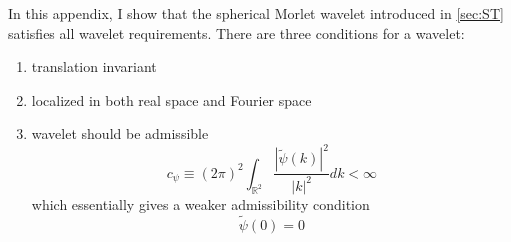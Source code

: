 In this appendix, I show that the spherical Morlet wavelet introduced in \cref{sec:ST} satisfies all wavelet requirements. 
There are three conditions for a wavelet:

\begin{enumerate}
    \item translation invariant 
    \item localized in both real space and Fourier space 
    \item wavelet should be admissible 
    \begin{equation}
        c_{\psi} \equiv (2 \pi)^2 \int_{\mathbb{R}^2} \frac{|\widetilde{\psi}(k)|^{2}}{|k|^2} d k<\infty
    \end{equation}
        which essentially gives a weaker admissibility condition
        \begin{equation}
            \widetilde{\psi}(0) = 0
        \end{equation}

    
\end{enumerate}